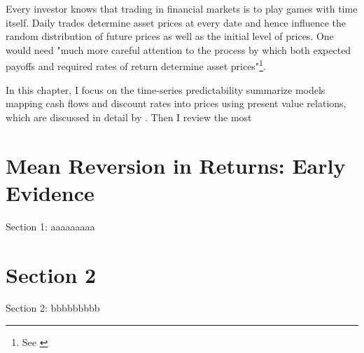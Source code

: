 \minitoc

\vspace{0.5cm}
Every investor knows that trading in financial markets is to play
games with time itself. Daily trades determine asset prices at every date and hence
influence the random distribution of future prices as well as the initial
level of prices. One would need "much more careful attention to the process
by which both expected payoffs and required rates of return determine
asset prices"\footnote{See \cite[p.~121]{campbell2017financial}}.

In this chapter, I focus on the time-series predictability summarize models 
mapping cash flows and discount rates into prices using present value relations, 
which are discussed in detail by \citet[Chapter~5]{campbell2017financial}. 
Then I review the most 

\section{Mean Reversion in Returns: Early Evidence}
Section 1: aaaaaaaaa

\section{Section 2}
Section 2: bbbbbbbbb